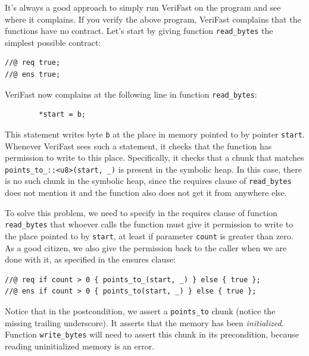 \documentclass{article}
\begin{document}
It's always a good approach to simply run VeriFast on the program and see where it complains. If you verify the above program, VeriFast complains that the functions have no contract.
Let's start by giving function \lstinline|read_bytes| the simplest possible contract:
\begin{lstlisting}
//@ req true;
//@ ens true;
\end{lstlisting}

VeriFast now complains at the following line in function \lstinline!read_bytes!:
\begin{lstlisting}
        *start = b;
\end{lstlisting}
This statement writes byte \lstinline!b! at the place in memory pointed to by pointer \lstinline!start!.
Whenever VeriFast sees such a statement, it checks that the function has permission to write to this place.
Specifically, it checks that a chunk that matches \lstinline!points_to_::<u8>(start, _)! is present in the symbolic heap.
In this case, there is no such chunk in the symbolic heap, since the requires clause of \lstinline!read_bytes! does not
mention it and the function also does not get it from anywhere else.

To solve this problem, we need to specify in the requires clause of function \lstinline!read_bytes! that whoever calls the function
must give it permission to write to the place pointed to by \lstinline!start!, at least if parameter \lstinline!count! is greater than zero.
As a good citizen, we also give the permission back to the caller when we are done with it, as specified in the ensures clause:
\begin{lstlisting}
//@ req if count > 0 { points_to_(start, _) } else { true };
//@ ens if count > 0 { points_to(start, _) } else { true };
\end{lstlisting}
Notice that in the postcondition, we assert a \lstinline|points_to| chunk (notice the missing trailing underscore). It asserts that the memory has been \emph{initialized}. Function \lstinline|write_bytes| will need to assert this chunk in its precondition, because reading uninitialized memory is an error.
\end{document}
